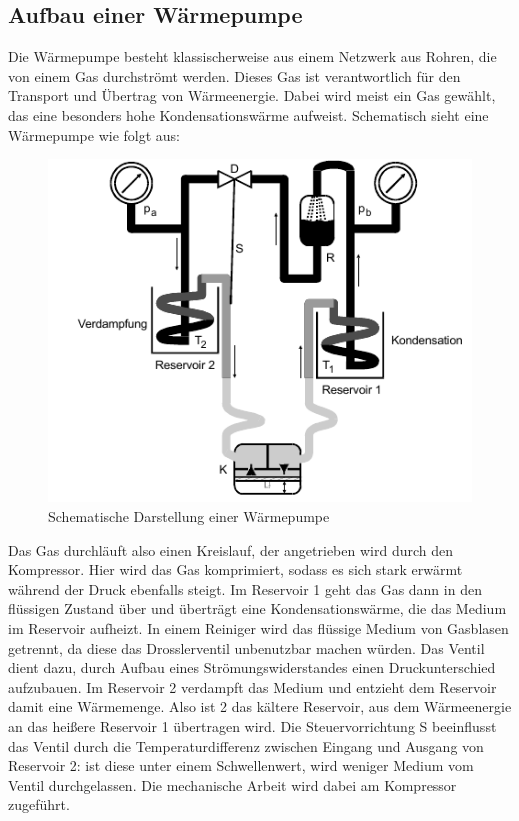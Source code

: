 \subsection{Aufbau einer Wärmepumpe}
Die Wärmepumpe besteht klassischerweise aus einem Netzwerk aus Rohren, die von einem Gas durchströmt werden. Dieses Gas ist verantwortlich für den Transport und
Übertrag von Wärmeenergie. Dabei wird meist ein Gas gewählt, das eine besonders hohe Kondensationswärme aufweist. 
Schematisch sieht eine Wärmepumpe wie folgt aus:
\begin{figure}
    \centering
    \includegraphics{WärmepunpeSchematisch1.png}
    \caption{Schematische Darstellung einer Wärmepumpe}
    \label{fig:schema}
\end{figure}
Das Gas durchläuft also einen Kreislauf, der angetrieben wird durch den Kompressor. Hier wird das Gas komprimiert, sodass es sich stark erwärmt während der Druck 
ebenfalls steigt. Im Reservoir 1 geht das Gas dann in den flüssigen Zustand über und überträgt eine Kondensationswärme, die das Medium im Reservoir aufheizt. 
In einem Reiniger wird das flüssige Medium von Gasblasen getrennt, da diese das Drosslerventil unbenutzbar machen würden. Das Ventil dient dazu, durch Aufbau
eines Strömungswiderstandes einen Druckunterschied aufzubauen. Im Reservoir 2 verdampft das Medium und entzieht dem Reservoir damit eine Wärmemenge. Also ist 2
das kältere Reservoir, aus dem Wärmeenergie an das heißere Reservoir 1 übertragen wird.
Die Steuervorrichtung S beeinflusst das Ventil durch die Temperaturdifferenz zwischen Eingang und Ausgang von Reservoir 2: ist diese unter einem Schwellenwert,
wird weniger Medium vom Ventil durchgelassen. 
Die mechanische Arbeit wird dabei am Kompressor zugeführt.

